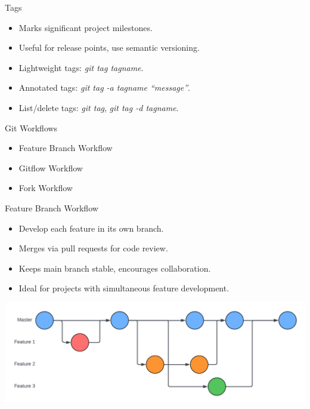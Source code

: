 \documentclass[aspectratio=169]{beamer}
\begin{document}
\begin{frame}{Tags}
    \begin{itemize}
        \item Marks significant project milestones.
        \item Useful for release points, use semantic versioning.
        \item Lightweight tags: \textit{git tag tagname}.
        \item Annotated tags: \textit{git tag -a tagname ``message''}.
        \item List/delete tags: \textit{git tag}, \textit{git tag -d tagname}.
    \end{itemize}
\end{frame}
\begin{frame}{Git Workflows}
    \begin{itemize}
        \item Feature Branch Workflow
        \item Gitflow Workflow
        \item Fork Workflow
    \end{itemize}
\end{frame}
\begin{frame}{Feature Branch Workflow}
    \begin{itemize}
        \item Develop each feature in its own branch.
        \item Merges via pull requests for code review.
        \item Keeps main branch stable, encourages collaboration.
        \item Ideal for projects with simultaneous feature development.
    \end{itemize}
    \begin{center}
        \includegraphics[scale=.25]{feature_workflow_diagram.png}
    \end{center}
\end{frame}
\end{document}
